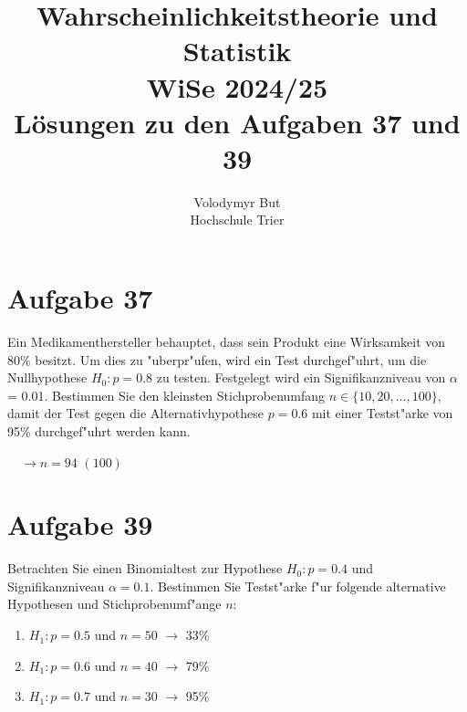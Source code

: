 \documentclass[10pt, oneside]{article}
\title{Wahrscheinlichkeitstheorie und Statistik\\[10pt]\Large WiSe 2024/25\\[15pt]\Large L{\"o}sungen zu den Aufgaben 37 und 39}
\author{Volodymyr But\\[10pt]Hochschule Trier}
\date{}
\begin{document}
\maketitle
\vspace{25px}

\section{Aufgabe 37}

Ein Medikamenthersteller behauptet, dass sein Produkt eine Wirksamkeit von 80\%
besitzt. Um dies zu "uberpr"ufen, wird ein Test durchgef"uhrt, um die
Nullhypothese $H_0 : p = 0.8$ zu testen. Festgelegt wird ein Signifikanzniveau
von $\alpha$ = 0.01. Bestimmen Sie den kleinsten Stichprobenumfang $n \in \{10,
20, ..., 100\}$, damit der Test gegen die Alternativhypothese $p = 0.6$ mit
einer Testst"arke von 95\% durchgef"uhrt werden kann.

$\quad\rightarrow n = 94$ $(100)$

\section{Aufgabe 39}

Betrachten Sie einen Binomialtest zur Hypothese $H_0 : p = 0.4$ und
Signifikanzniveau $\alpha = 0.1$. Bestimmen Sie Testst"arke f"ur folgende
alternative Hypothesen und Stichprobenumf"ange $n$:

\begin{enumerate}
    \item $H_1 : p = 0.5$ und $n = 50$
        $\rightarrow$ 33\%
    \item $H_1 : p = 0.6$ und $n = 40$
        $\rightarrow$ 79\%
    \item $H_1 : p = 0.7$ und $n = 30$
        $\rightarrow$ 95\%
\end{enumerate}

%
\end{document}
